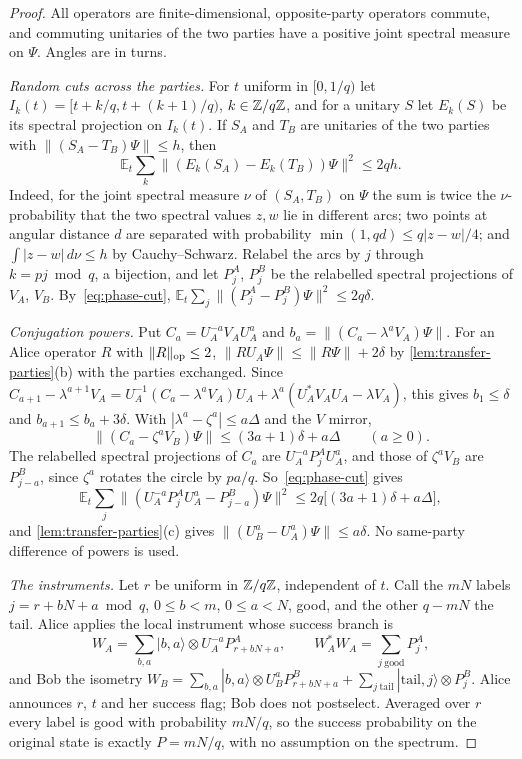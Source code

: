 \begin{proof}
All operators are finite-dimensional, opposite-party operators commute, and commuting unitaries of the two parties have a
positive joint spectral measure on $\Psi$. Angles are in turns.

\emph{Random cuts across the parties.} For $t$ uniform in $[0,1/q)$ let $I_k(t)=[t+k/q,t+(k+1)/q)$, $k\in\mathbb Z/q\mathbb Z$, and for a unitary
$S$ let $E_k(S)$ be its spectral projection on $I_k(t)$. If $S_A$ and $T_B$ are unitaries of the two parties with
$\|(S_A-T_B)\Psi\|\le h$, then
\begin{equation}\label{eq:phase-cut}
\mathbb E_t\sum_k\|(E_k(S_A)-E_k(T_B))\Psi\|^2\le2qh .
\end{equation}
Indeed, for the joint spectral measure $\nu$ of $(S_A,T_B)$ on $\Psi$ the sum is twice the $\nu$-probability that the two
spectral values $z,w$ lie in different arcs; two points at angular distance $d$ are separated with probability
$\min(1,qd)\le q|z-w|/4$; and $\int|z-w|\,d\nu\le h$ by Cauchy--Schwarz. Relabel the arcs by $j$ through $k=pj\bmod q$, a bijection, and let $P^A_j$, $P^B_j$ be the relabelled spectral
projections of $V_A$, $V_B$. By~\eqref{eq:phase-cut}, $\mathbb E_t\sum_j\|(P^A_j-P^B_j)\Psi\|^2\le2q\delta$.

\emph{Conjugation powers.} Put $C_a=U_A^{-a}V_AU_A^a$ and $b_a=\|(C_a-\lambda^aV_A)\Psi\|$. For an Alice operator $R$ with $\lVert R\rVert_{\mathrm{op}}\le2$,
$\|RU_A\Psi\|\le\|R\Psi\|+2\delta$ by \cref{lem:transfer-parties}(b) with the parties exchanged. Since
$C_{a+1}-\lambda^{a+1}V_A=U_A^{-1}(C_a-\lambda^aV_A)U_A+\lambda^a(U_A^*V_AU_A-\lambda V_A)$, this gives $b_1\le\delta$ and $b_{a+1}\le b_a+3\delta$. With
$|\lambda^a-\zeta^a|\le a\Delta$ and the $V$ mirror,
\[
\|(C_a-\zeta^aV_B)\Psi\|\le(3a+1)\delta+a\Delta\qquad(a\ge0).
\]
The relabelled spectral projections of $C_a$ are $U_A^{-a}P^A_jU_A^a$, and those of $\zeta^aV_B$ are $P^B_{j-a}$, since $\zeta^a$ rotates the
circle by $pa/q$. So~\eqref{eq:phase-cut} gives
\begin{equation}\label{eq:phase-transport}
\mathbb E_t\sum_j\|(U_A^{-a}P^A_jU_A^a-P^B_{j-a})\Psi\|^2\le2q\bigl[(3a+1)\delta+a\Delta\bigr],
\end{equation}
and \cref{lem:transfer-parties}(c) gives $\|(U_B^a-U_A^a)\Psi\|\le a\delta$. No same-party difference of powers is used.

\emph{The instruments.} Let $r$ be uniform in $\mathbb Z/q\mathbb Z$, independent of $t$. Call the $mN$ labels $j=r+bN+a\bmod q$, $0\le b<m$, $0\le a<N$,
good, and the other $q-mN$ the tail. Alice applies the local instrument whose success branch is
\[
W_A=\sum_{b,a}|b,a\rangle\otimes U_A^{-a}P^A_{r+bN+a},\qquad W_A^*W_A=\sum_{j\ \mathrm{good}}P^A_j ,
\]
and Bob the isometry $W_B=\sum_{b,a}|b,a\rangle\otimes U_B^aP^B_{r+bN+a}+\sum_{j\ \mathrm{tail}}|\mathrm{tail},j\rangle\otimes P^B_j$. Alice
announces $r$, $t$ and her success flag; Bob does not postselect. Averaged over $r$ every label is good with probability $mN/q$, so
the success probability on the original state is exactly $P=mN/q$, with no assumption on the spectrum.


\end{proof}
